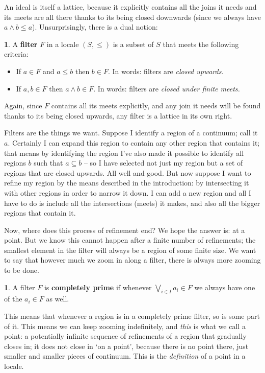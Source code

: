 \documentclass[oneside,english]{amsbook}
\numberwithin{section}{chapter}
\theoremstyle{plain}
\theoremstyle{definition}
\newtheorem{defn}[thm]{\protect\definitionname}
\providecommand{\definitionname}{Definition}
\begin{document}
An ideal is itself a lattice, because it explicitly contains all the joins it needs and its meets are all there thanks to its being closed downwards (since we always have $a\land b\le a$). Unsurprisingly, there is a dual notion: 

\begin{defn} 
	A \textbf{filter} $F$ in a locale $(S,\le)$ is a subset of $S$ that meets the following criteria: 
	\begin{itemize} 
		\item If $a\in F$ and $a\le b$ then $b\in F$. In words: filters are \emph{closed upwards.} 
		\item If $a,b\in F$ then $a\land b\in F$. In words: filters are \emph{closed under finite meets.} 
	\end{itemize} 
\end{defn} 

Again, since $F$ contains all its meets explicitly, and any join it needs will be found thanks to its being closed upwards, any filter is a lattice in its own right.

Filters are the things we want. Suppose I identify a region of a continuum; call it $a$. Certainly I can expand this region to contain any other region that contains it; that means by identifying the region I've also made it possible to identify all regions $b$ such that $a\subseteq b$ -- so I have selected not just my region but a set of regions that are closed upwards. All well and good. But now suppose I want to refine my region by the means described in the introduction: by intersecting it with other regions in order to narrow it down. I can add a new region and all I have to do is include all the intersections (meets) it makes, and also all the bigger regions that contain it. 

Now, where does this process of refinement end? We hope the answer is: at a point. But we know this cannot happen after a finite number of refinements; the smallest element in the filter will always be a region of some finite size. We want to say that however much we zoom in along a filter, there is always more zooming to be done. 

\begin{defn} 
	A filter $F$ is \textbf{completely prime }if whenever $\bigvee_{i\in I}a_{i}\in F$ we always have one of the $a_{i}\in F$ as well. 
\end{defn} 

This means that whenever a region is in a completely prime filter, so is some part of it. This means we can keep zooming indefinitely, and \emph{this} is what we call a point: a potentially infinite sequence of refinements of a region that gradually closes in; it does not close in `on a point', because there is no point there, just smaller and smaller pieces of continuum. This is the \emph{definition} of a point in a locale. 
\end{document}
